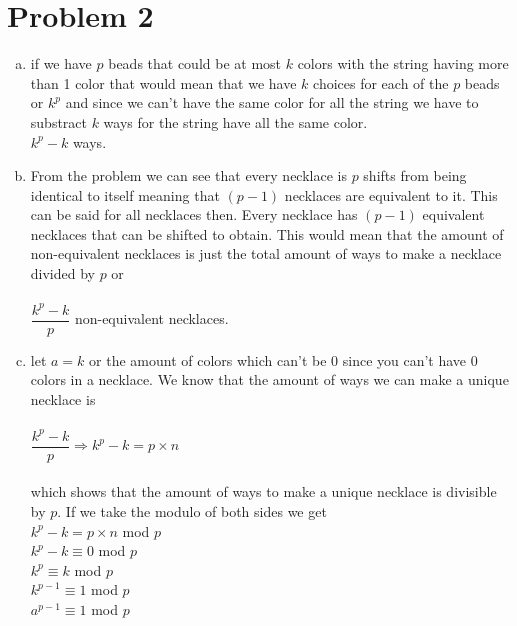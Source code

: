 \documentclass[11pt,letterpaper]{article}
\begin{document}
\section*{Problem 2}
\begin{enumerate}[(a)]
\item
if we have $p$ beads that could be at most $k$ colors with the string having more than 1 color that would mean that we have $k$ choices for each of the $p$ beads or $k^p$ and since we can't have the same color for all the string we have to substract $k$ ways for the string have all the same color.\\
$k^p -k$ ways.
\item
From the problem we can see that every necklace is $p$ shifts from being identical to itself meaning that $(p-1)$ necklaces are equivalent to it. This can be said for all necklaces then. Every necklace has $(p-1)$ equivalent necklaces that can be shifted to obtain. This would mean that the amount of non-equivalent necklaces is just the total amount of ways to make a necklace divided by $p$ or \\\\
$\dfrac{k^p-k}{p}$ non-equivalent necklaces.
\item
let $a=k$ or the amount of colors which can't be 0 since you can't have 0 colors in a necklace. We know that the amount of ways we can make a unique necklace is\\\\
$\dfrac{k^p-k}{p}\Rightarrow k^p-k = p\times n$\\\\
which shows that the amount of ways to make a unique necklace is divisible by $p$.
If we take the modulo of both sides we get\\
$k^p-k = p\times n$ mod $p$\\
$k^p-k \equiv 0$ mod $p$\\
$k^p \equiv k$ mod $p$\\
$k^{p-1} \equiv 1$ mod $p$\\
$a^{p-1} \equiv 1$ mod $p$\\

\end{enumerate}
\clearpage
\end{document}
